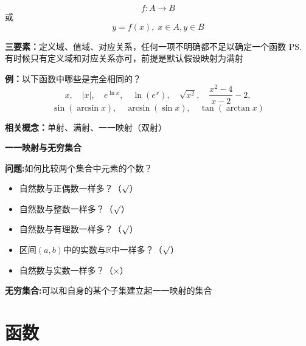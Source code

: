 $$f:A\to B$$
或
$$y=f(x),\;x\in A,y\in B$$

{\bf 三要素：}定义域、值域、对应关系，任何一项不明确都不足以确定一个函数
\ps{有时候只有定义域和对应关系亦可，前提是默认假设映射为满射}

{{\bf 例：}以下函数中哪些是完全相同的？}
		$$x,\quad |x|,\quad e^{\ln x},\quad \ln(e^x),\quad \sqrt{x^2},\quad
		\frac{x^2-4}{x-2}-2,$$
		$$\sin(\arcsin x),\quad \arcsin(\sin x), \quad \tan(\arctan x)$$

{\bf 相关概念：}单射、满射、一一映射（双射）

\begin{shaded}
	{\bf 一一映射与无穷集合}
	
{\bf 问题:}如何比较两个集合中元素的个数？
\begin{itemize}
  \item 自然数与正偶数一样多？（{$\surd$}）
  \item 自然数与整数一样多？（{$\surd$}）
  \item 自然数与有理数一样多？（{$\surd$}）
  \item 区间$(a,b)$中的实数与$\mathbb{R}$中一样多？（{$\surd$}）
  \item 自然数与实数一样多？（{$\times$}）
\end{itemize}
	
{\bf 无穷集合:}可以和自身的某个子集建立起一一映射的集合
\end{shaded}	

	
\section{函数}
	
